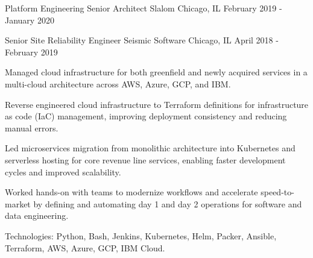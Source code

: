 \begin{cventries}
  \cventry
    {Platform Engineering Senior Architect} %
    {Slalom} %
    {Chicago, IL} %
    {February 2019 - January 2020} %
    {
      \begin{cvitems} %
      \end{cvitems}
    }

  \cventry
    {Senior Site Reliability Engineer} %
    {Seismic Software} %
    {Chicago, IL} %
    {April 2018 - February 2019} %
    {
      \begin{cvitems} %
        \item {Managed cloud infrastructure for both greenfield and newly acquired services in a multi-cloud architecture across AWS, Azure, GCP, and IBM.}
        \item {Reverse engineered cloud infrastructure to Terraform definitions for infrastructure as code (IaC) management, improving deployment consistency and reducing manual errors.}
        \item {Led microservices migration from monolithic architecture into Kubernetes and serverless hosting for core revenue line services, enabling faster development cycles and improved scalability.}
        \item {Worked hands-on with teams to modernize workflows and accelerate speed-to-market by defining and automating day 1 and day 2 operations for software and data engineering.}
        \item {Technologies: Python, Bash, Jenkins, Kubernetes, Helm, Packer, Ansible, Terraform, AWS, Azure, GCP, IBM Cloud.}
      \end{cvitems}
    }


\end{cventries}
